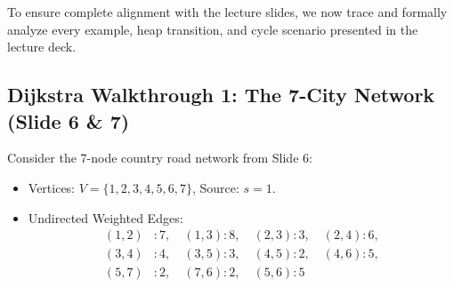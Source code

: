 \documentclass[10pt,journal,compsoc,onecolumn]{IEEEtran}
\begin{document}
To ensure complete alignment with the lecture slides, we now trace and formally analyze every example, heap transition, and cycle scenario presented in the lecture deck.

\subsection{Dijkstra Walkthrough 1: The 7-City Network (Slide 6 \& 7)}
Consider the 7-node country road network from Slide 6:
\begin{itemize}
    \item Vertices: $V = \{1, 2, 3, 4, 5, 6, 7\}$, Source: $s = 1$.
    \item Undirected Weighted Edges:
    \begin{align*}
    (1, 2) &: 7, \quad (1, 3) : 8, \quad (2, 3) : 3, \quad (2, 4) : 6, \\
    (3, 4) &: 4, \quad (3, 5) : 3, \quad (4, 5) : 2, \quad (4, 6) : 5, \\
    (5, 7) &: 2, \quad (7, 6) : 2, \quad (5, 6) : 5
    \end{align*}
\end{itemize}
\end{document}
